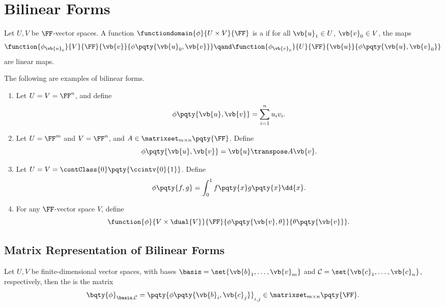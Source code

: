 \section{Bilinear Forms}

\begin{definition}
    Let \(U, V\) be \(\FF\)-vector spaces. A function \(\functiondomain{\phi}{U \times V}{\FF}\) is a  if for all \(\vb{u}_1 \in U\), \(\vb{v}_0 \in V\), the maps
    \[
        \function{\phi_{\vb{u}_0}}{V}{\FF}{\vb{v}}{\phi\pqty{\vb{u}_0, \vb{v}}} \qand \function{\phi_{\vb{v}_0}}{U}{\FF}{\vb{u}}{\phi\pqty{\vb{u}, \vb{v}_0}}
    \]
    are linear maps.
\end{definition}

\begin{examples}
    The following are examples of bilinear forms.

    \begin{enumerate}[label=(\roman*)]
        \item Let \(U = V = \FF^n\), and define
        \[
            \phi\pqty{\vb{u}, \vb{v}} = \sum_{i=1}^n u_i v_i.
        \]

        \item Let \(U = \FF^m\) and \(V = \FF^n\), and \(A \in \matrixset_{m \times n} \pqty{\FF}\). Define
        \[
            \phi\pqty{\vb{u}, \vb{v}} = \vb{u}\transpose A \vb{v}.
        \]

        \item Let \(U = V = \contClass{0} \pqty{\ccintv{0}{1}}\). Define
        \[
            \phi\pqty{f, g} = \int_0^1 f\pqty{x} g\pqty{x} \dd{x}.
        \]

        \item For any \(\FF\)-vector space \(V\), define
        \[
            \function{\phi}{V \times \dual{V}}{\FF}{\phi\pqty{\vb{v}, \theta}}{\theta\pqty{\vb{v}}}.
        \]
    \end{enumerate}
\end{examples}

\subsection{Matrix Representation of Bilinear Forms}

\begin{definition}
    Let \(U, V\) be finite-dimensional vector spaces, with bases \(\basis = \set{\vb{b}_1, \ldots, \vb{v}_m}\) and \(\mathcal{C} = \set{\vb{c}_1, \ldots, \vb{c}_n}\), respectively, then the  is the matrix
    \[
        \bqty{\phi}_{\basis, \mathcal{C}} = \pqty{\phi\pqty{\vb{b}_i, \vb{c}_j}}_{i, j} \in \matrixset_{m \times n} \pqty{\FF}.
    \]
\end{definition}

